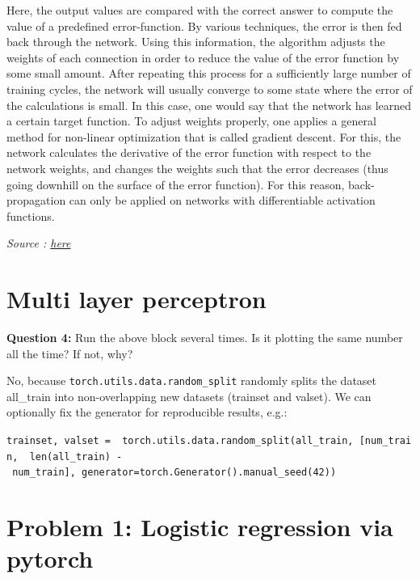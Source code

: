 \documentclass[10pt,a4paper]{article}
\theoremstyle{break}
\begin{document}
Here, the output values are compared with the correct answer to compute the value of a predefined error-function. By various techniques, the error is then fed back through the network. Using this information, the algorithm adjusts the weights of each connection in order to reduce the value of the error function by some small amount. After repeating this process for a sufficiently large number of training cycles, the network will usually converge to some state where the error of the calculations is small. In this case, one would say that the network has learned a certain target function. To adjust weights properly, one applies a general method for non-linear optimization that is called gradient descent. For this, the network calculates the derivative of the error function with respect to the network weights, and changes the weights such that the error decreases (thus going downhill on the surface of the error function). For this reason, back-propagation can only be applied on networks with differentiable activation functions.

\emph{Source : \href{https://medium.com/analytics-vidhya/backpropagation-algorithm-using-pytorch-ee1287888aca}{here}}

\hypertarget{multi-layer-perceptron}{%
\section{Multi layer perceptron}\label{multi-layer-perceptron}}

\begin{tcolorbox}

\textbf{Question 4:} Run the above block several times. Is it plotting the same number all the time? If not, why?

\end{tcolorbox}

No, because \texttt{torch.utils.data.random\_split} randomly splits the dataset all\_train into non-overlapping new datasets (trainset and valset).
We can optionally fix the generator for reproducible results, e.g.:

\texttt{trainset,\ valset\ =\ \ torch.utils.data.random\_split(all\_train,\ {[}num\_train,\ \ len(all\_train)\ -\ num\_train{]},\ generator=torch.Generator().manual\_seed(42))}

\hypertarget{problem-1-logistic-regression-via-pytorch}{%
\section{Problem 1: Logistic regression via pytorch}\label{problem-1-logistic-regression-via-pytorch}}
\end{document}
